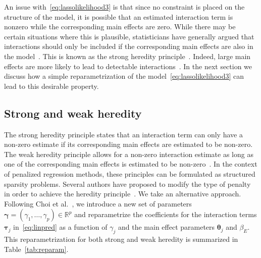 \documentclass[12pt,letter]{article}\usepackage[]{graphicx}\usepackage[]{color}
\makeatletter
\newcommand{\tm}[1]{\textrm{{#1}}}
\newcommand{\balpha}{\boldsymbol{\alpha}}
\newcommand{\btau}{\boldsymbol{\tau}}
\newcommand{\bgamma}{\boldsymbol{\gamma}}
\newcommand{\btheta}{\boldsymbol{\theta}}
\DeclarePairedDelimiter\norm{\lVert}{\rVert}%
\let\oldnorm\norm
\def\norm{\@ifstar{\oldnorm}{\oldnorm*}}
\makeatother
\begin{document}
An issue with~\eqref{eq:lassolikelihood3} is that since no constraint is placed on the structure of the model, it is possible that an estimated interaction term is nonzero while the corresponding main effects are zero. While there may be certain situations where this is plausible, statisticians have generally argued that interactions should only be included if the corresponding main effects are also in the model~\citep{mccullagh1989generalized}. This is known as the strong heredity principle~\citep{chipman1996bayesian}. Indeed, large main effects are more likely to lead to detectable interactions~\citep{cox1984interaction}. In the next section we discuss how a simple reparametrization of the model~\eqref{eq:lassolikelihood3} can lead to this desirable property. 

\subsection{Strong and weak heredity}

The strong heredity principle states that an interaction term can only have a non-zero estimate if its corresponding main effects are estimated to be non-zero. The weak heredity principle allows for a non-zero interaction estimate as long as one of the corresponding main effects is estimated to be non-zero~\citep{chipman1996bayesian}. In the context of penalized regression methods, these principles can be formulated as structured sparsity \citep{bach2012structured} problems. Several authors have proposed to modify the type of penalty in order to achieve the heredity principle~\citep{radchenko2010variable,bien2013lasso,lim2015learning,haris2016convex}. We take an alternative approach. Following Choi et al.~\citep{choi2010variable}, we introduce a new set of parameters $\bgamma = (\gamma_1, \ldots, \gamma_p)\in \mathbb{R}^p$ and reparametrize the coefficients for the interaction terms $\btau_j$ in~\eqref{eq:linpred} as a function of $\gamma_j$ and the main effect parameters $\btheta_j$ and $\beta_E$. This reparametrization for both strong and weak heredity is summarized in Table~\ref{tab:reparam}.
\end{document}
